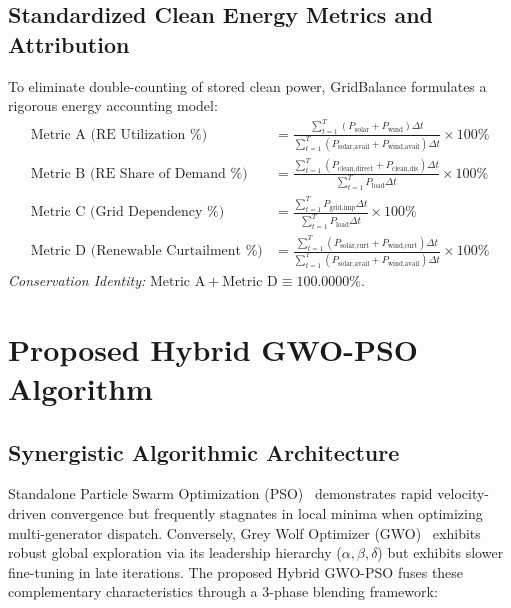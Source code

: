 \documentclass[conference]{IEEEtran}
\begin{document}
\subsection{Standardized Clean Energy Metrics and Attribution}
To eliminate double-counting of stored clean power, GridBalance formulates a rigorous energy accounting model:
\begin{align}
\text{Metric A (RE Utilization \%)} &= \frac{\sum_{t=1}^T (P_{\text{solar}} + P_{\text{wind}}) \Delta t}{\sum_{t=1}^T (P_{\text{solar,avail}} + P_{\text{wind,avail}}) \Delta t} \times 100\% \\
\text{Metric B (RE Share of Demand \%)} &= \frac{\sum_{t=1}^T (P_{\text{clean,direct}} + P_{\text{clean,dis}}) \Delta t}{\sum_{t=1}^T P_{\text{load}} \Delta t} \times 100\% \\
\text{Metric C (Grid Dependency \%)} &= \frac{\sum_{t=1}^T P_{\text{grid,imp}} \Delta t}{\sum_{t=1}^T P_{\text{load}} \Delta t} \times 100\% \\
\text{Metric D (Renewable Curtailment \%)} &= \frac{\sum_{t=1}^T (P_{\text{solar,curt}} + P_{\text{wind,curt}}) \Delta t}{\sum_{t=1}^T (P_{\text{solar,avail}} + P_{\text{wind,avail}}) \Delta t} \times 100\%
\end{align}
\textit{Conservation Identity:} $\text{Metric A} + \text{Metric D} \equiv 100.0000\%$.

\section{Proposed Hybrid GWO-PSO Algorithm}

\subsection{Synergistic Algorithmic Architecture}
Standalone Particle Swarm Optimization (PSO)~\cite{kennedy1995pso} demonstrates rapid velocity-driven convergence but frequently stagnates in local minima when optimizing multi-generator dispatch. Conversely, Grey Wolf Optimizer (GWO)~\cite{mirjalili2014gwo} exhibits robust global exploration via its leadership hierarchy ($\alpha, \beta, \delta$) but exhibits slower fine-tuning in late iterations. The proposed Hybrid GWO-PSO fuses these complementary characteristics through a 3-phase blending framework:
\end{document}

